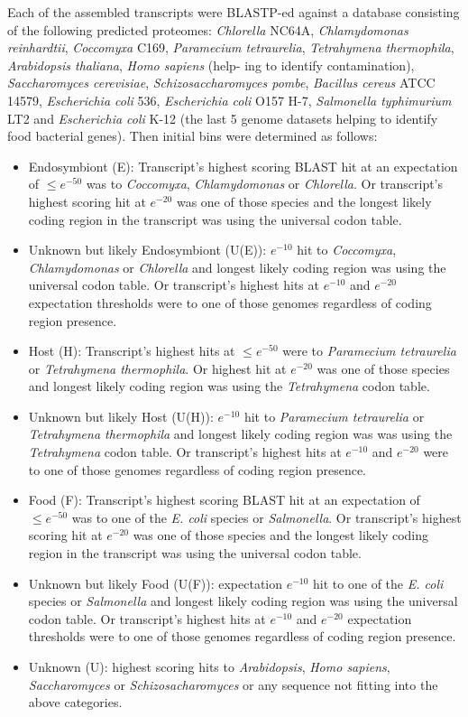 Each of the assembled transcripts were BLASTP-ed against a database consisting of the following predicted proteomes: 
\textit{Chlorella} NC64A, \textit{Chlamydomonas reinhardtii}, \textit{Coccomyxa} C169,
\textit{Paramecium tetraurelia}, \textit{Tetrahymena thermophila}, \textit{Arabidopsis thaliana}, \textit{Homo sapiens} (help-
    ing to identify contamination), \textit{Saccharomyces cerevisiae}, \textit{Schizosaccharomyces pombe}, \textit{Bacillus
cereus} ATCC 14579, \textit{Escherichia coli} 536, \textit{Escherichia coli} O157 H-7, \textit{Salmonella typhimurium}
LT2 and \textit{Escherichia coli} K-12 (the last 5 genome datasets helping to identify food bacterial
genes). Then initial bins were determined as follows:
\begin{itemize}
    \item Endosymbiont (E): Transcript’s highest scoring BLAST hit at an expectation of \(\leq e^{-50}\) was to \textit{Coccomyxa},
        \textit{Chlamydomonas} or \textit{Chlorella}. Or transcript’s highest scoring hit at \(e^{-20}\) was one of those
species and the longest likely coding region in the transcript was using the universal codon
table.
\item Unknown but likely Endosymbiont (U(E)): \(e^{-10}\) hit to \textit{Coccomyxa}, \textit{Chlamydomonas} or
    \textit{Chlorella} and longest likely coding region was using the universal codon table. Or transcript’s 
    highest hits at \(e^{-10}\) and \(e^{-20}\) expectation thresholds were to one of those genomes regardless of coding
region presence.
\item Host (H): Transcript’s highest hits at \(\leq e^{-50}\) were to \textit{Paramecium tetraurelia} or \textit{Tetrahymena
        thermophila}. Or highest hit at \(e^{-20}\) was one of those species and longest likely coding
    region was using the \textit{Tetrahymena} codon table.
\item Unknown but likely Host (U(H)): \(e^{-10}\) hit to \textit{Paramecium tetraurelia} or \textit{Tetrahymena
    thermophila} and longest likely coding region was was using the \textit{Tetrahymena} codon table.
    Or transcript’s highest hits at \(e^{-10}\) and \(e^{-20}\) were to one of those genomes regardless of
coding region presence.
\item Food (F): Transcript’s highest scoring BLAST hit at an expectation of \(\leq e^{-50}\) was to one of the \textit{E. coli} species
    or \textit{Salmonella}. Or transcript’s highest scoring hit at \(e^{-20}\) was one of those species and
the longest likely coding region in the transcript was using the universal codon table.
\item Unknown but likely Food (U(F)): expectation \(e^{-10}\) hit to one of the \textit{E. coli} species or \textit{Salmonella} and
longest likely coding region was using the universal codon table. Or transcript’s highest
hits at \(e^{-10}\) and \(e^{-20}\) expectation thresholds were to one of those genomes regardless of coding region presence.
\item Unknown (U): highest scoring hits to \textit{Arabidopsis}, \textit{Homo sapiens}, \textit{Saccharomyces} or \textit{Schizosacharomyces} 
    or any sequence not fitting into the above categories.
\end{itemize}

